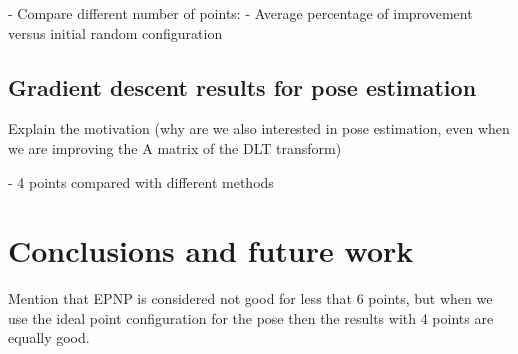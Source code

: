 \documentclass[letterpaper, 10 pt, conference]{ieeeconf}  %
\begin{document}

- Compare different number of points:
	- Average percentage of improvement versus initial random configuration
	


\subsection{Gradient descent results for pose estimation}
Explain the motivation (why are we also interested in pose estimation, even when we are improving the A matrix of the DLT transform)


- 4 points compared with different methods


\section{Conclusions and future work}
\label{Conc}
Mention that EPNP is considered not good for less that 6 points, but when we use the ideal point configuration for the pose then the results with 4 points are equally good.










{\small

}
\end{document}
